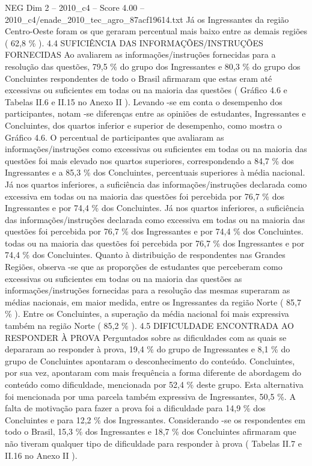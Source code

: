 \begin{textsample}{NEG Dim 2 – 2010\_c4 – Score 4.00 – 2010\_c4/enade\_2010\_tec\_agro\_87acf19614.txt}
Já os Ingressantes da região Centro-Oeste foram os que geraram percentual mais baixo entre as demais regiões ( 62,8 \% ). 4.4 SUFICIÊNCIA DAS INFORMAÇÕES/INSTRUÇÕES FORNECIDAS Ao avaliarem as informações/instruções fornecidas para a resolução das questões, 79,5 \% do grupo dos Ingressantes e 80,3 \% do grupo dos Concluintes respondentes de todo o Brasil afirmaram que estas eram até excessivas ou suficientes em todas ou na maioria das questões ( Gráfico 4.6 e Tabelas II.6 e II.15 no Anexo II ).
Levando -se em conta o desempenho dos participantes, notam -se diferenças entre as opiniões de estudantes, Ingressantes e Concluintes, dos quartos inferior e superior de desempenho, como mostra o Gráfico 4.6.
O percentual de participantes que avaliaram as informações/instruções como excessivas ou suficientes em todas ou na maioria das questões foi mais elevado nos quartos superiores, correspondendo a 84,7 \% dos Ingressantes e a 85,3 \% dos Concluintes, percentuais superiores à média nacional.
Já nos quartos inferiores, a suficiência das informações/instruções declarada como excessiva em todas ou na maioria das questões foi percebida por 76,7 \% dos Ingressantes e por 74,4 \% dos Concluintes.
Já nos quartos inferiores, a suficiência das informações/instruções declarada como excessiva em todas ou na maioria das questões foi percebida por 76,7 \% dos Ingressantes e por 74,4 \% dos Concluintes. todas ou na maioria das questões foi percebida por 76,7 \% dos Ingressantes e por 74,4 \% dos Concluintes.
Quanto à distribuição de respondentes nas Grandes Regiões, observa -se que as proporções de estudantes que perceberam como excessivas ou suficientes em todas ou na maioria das questões as informações/instruções fornecidas para a resolução das mesmas superaram as médias nacionais, em maior medida, entre os Ingressantes da região Norte ( 85,7 \% ).
Entre os Concluintes, a superação da média nacional foi mais expressiva também na região Norte ( 85,2 \% ). 4.5 DIFICULDADE ENCONTRADA AO RESPONDER À PROVA Perguntados sobre as dificuldades com as quais se depararam ao responder à prova, 19,4 \% do grupo de Ingressantes e 8,1 \% do grupo de Concluintes apontaram o desconhecimento do conteúdo.
Concluintes, por sua vez, apontaram com mais frequência a forma diferente de abordagem do conteúdo como dificuldade, mencionada por 52,4 \% deste grupo.
Esta alternativa foi mencionada por uma parcela também expressiva de Ingressantes, 50,5 \%.
A falta de motivação para fazer a prova foi a dificuldade para 14,9 \% dos Concluintes e para 12,2 \% dos Ingressantes.
Considerando -se os respondentes em todo o Brasil, 15,3 \% dos Ingressantes e 18,7 \% dos Concluintes afirmaram que não tiveram qualquer tipo de dificuldade para responder à prova ( Tabelas II.7 e II.16 no Anexo II ).

\end{textsample}
